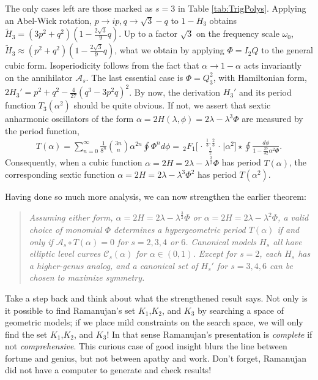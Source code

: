 \documentclass[nofootinbib,preprint]{revtex4-1}
\newcommand{\tFo}[3]{\,_2F_1 \bigg[ 
\genfrac..{0pt}{}{#1}{#2}\bigg| #3 \bigg]}
\begin{document}
The only cases left are those marked as $s=3$ in Table \ref{tab:TrigPolys}. Applying
an Abel-Wick rotation, $p\rightarrow i p, q\rightarrow \sqrt{3}-q$ to $1-H_3$ obtains 
$\widetilde{H}_3=(3p^2+q^2)(1-\frac{2\sqrt{3}}{9}q)$. Up to a factor $\sqrt{3}$ on 
the frequency scale $\omega_0$, $\widetilde{H}_3 \approx (p^2+q^2)(1-\frac{2\sqrt{3}}{9}q)$,
what we obtain by applying ${\Phi=I_2Q}$ to the general cubic form. Isoperiodicity follows
from the fact that $\alpha \rightarrow 1-\alpha$ acts invariantly on the annihilator 
$\mathcal{A}_s$. The last essential case is $\Phi=Q_3^2$, 
with Hamiltonian form, ${2H_3'=p^2+q^2-\frac{4}{27}( q^3-3 p^2 q)^2}$. 
By now, the derivation $H_3'$ and its period function $T_3(\alpha^2)$
should be quite obvious. If not, we assert that sextic anharmonic 
oscillators of the form  $\alpha = 2H(\lambda,\phi)=2\lambda-\lambda^3\Phi$ 
are measured by the period function, 
\begin{eqnarray}
T(\alpha) = \sum_{n=0}^{\infty} \frac{1}{8^n}\binom{3n}{n}\alpha^{2n} \oint \Phi^n d\phi 
= \tFo{\frac{1}{3},\frac{2}{3}}{\frac{1}{2}}{\alpha^2}\star\oint\frac{d\phi}{1-\frac{27}{32}\alpha^2\Phi} . \nonumber
\end{eqnarray}
Consequently, when a cubic function $\alpha=2H=2\lambda -\lambda^{\frac{3}{2}}\Phi$ has period $T(\alpha)$, 
the corresponding sextic function $\alpha=2H=2\lambda -\lambda^{3}\Phi^2$ has period $T(\alpha^2)$. 

Having done so much more analysis, we can now strengthen the earlier theorem:
\begin{quote}
\textit{Assuming either form, $\alpha=2H=2\lambda-\lambda^{\frac{3}{2}}\Phi$ or 
$\alpha=2H=2\lambda-\lambda^2\Phi$, a valid choice of monomial $\Phi$ determines 
a hypergeometric period $T(\alpha)$ if and only if $\mathcal{A}_s \circ T(\alpha)=0$
for $s=2,3,4$ or $6$. Canonical models $H_s$ all have elliptic level curves $\mathcal{C}_{s}(\alpha)$
for $\alpha \in (0,1)$. Except for $s=2$, each $H_s$ has a higher-genus analog, and 
a canonical set of $H_s'$ for $s=3,4,6$ can be chosen to maximize symmetry.}
\end{quote}
Take a step back and think about what the strengthened result says. Not only is it possible 
to find Ramanujan's set $K_1$,$K_2$, and $K_3$ by searching a space of geometric models;
if we place mild constraints on the search space, we will only find the set 
$K_1$,$K_2$, and $K_3$! In that sense Ramanujan's presentation is \textit{complete} if not 
\textit{comprehensive}. This curious case of good insight blurs the line between 
fortune and genius, but not between apathy and work. Don't forget, Ramanujan did not have a computer 
to generate and check results!
\end{document}

